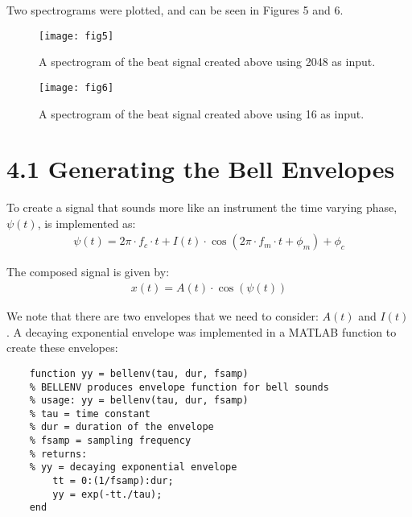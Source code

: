 \documentclass{article}
\begin{document}
Two spectrograms were plotted, and can be seen in Figures 5 and 6.

\begin{figure}[H]
	\centering
	\begin{minipage}{5cm}		
		\texttt{[image: fig5]}
		\caption{A spectrogram of the beat signal created above using 2048 as input.}
	\end{minipage}
	\hspace{2cm}
	\begin{minipage}{5cm}
		\texttt{[image: fig6]}
		\caption{A spectrogram of the beat signal created above using 16 as input.}
	\end{minipage}
\end{figure}

\section{4.1 Generating the Bell Envelopes}

To create a signal that sounds more like an instrument the time varying phase, $\psi(t)$, is implemented as:
\begin{align}
	\psi(t) = 2 \pi \cdot f_c \cdot t + I(t) \cdot \cos(2 \pi \cdot f_m \cdot t + \phi_m) + \phi_c
\end{align}

The composed signal is given by:
\begin{align}
	x(t) = A(t) \cdot \cos(\psi(t))
\end{align}

We note that there are two envelopes that we need to consider: $A(t)$ and $I(t)$. A decaying exponential envelope was implemented in a MATLAB function to create these envelopes:
\begin{lstlisting}
	function yy = bellenv(tau, dur, fsamp)
	% BELLENV produces envelope function for bell sounds
	% usage: yy = bellenv(tau, dur, fsamp)
	% tau = time constant
	% dur = duration of the envelope
	% fsamp = sampling frequency
	% returns:
	% yy = decaying exponential envelope
	    tt = 0:(1/fsamp):dur;
	    yy = exp(-tt./tau);
	end
\end{lstlisting}
\end{document}
